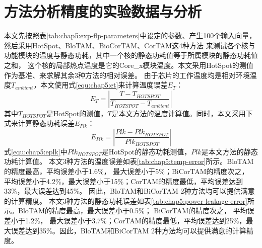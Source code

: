 \section{方法分析精度的实验数据与分析}
本文先按照表\ref{tab:chap5:exp-flp-parameters}中设定的参数、产生100个输入向量， 然后采用HotSpot、BloTAM、BioCorTAM、CorTAM这4种方法 来测试各个核与功能模块的温度与静态功耗，其中一个核的静态功耗值等于所属模块的静态功耗值之和， 这个核的局部热点温度是它的Core\_x模块温度。本文采用HotSpot的测值作为基准、来求解其余3种方法的相对误差。 由于芯片的工作温度均是相对环境温度$T_{ambient}$，本文使用式\ref{equ:chap5:et}来计算温度误差$E_T$：
\begin{equation}
\label{equ:chap5:et}
E_T = |\frac{T-T_{HOTSPOT}}{T_{HOTSPOT}-T_{ambient}}|
\end{equation}
其中$T_{HOTSPOT}$是HotSpot的测值，$T$是本文方法的温度计算值。同时，本文采用下式来计算静态功耗误差$E_{Plk}$：
\begin{equation}
\label{equ:chap5:eplk}
E_{Plk} = |\frac{Plk-Plk_{HOTSPOT}}{Plk_{HOTSPOT}}|
\end{equation}
式\ref{equ:chap5:eplk}中$Plk_{HOTSPOT}$是HotSpot的静态功耗测值，$Plk$是本文方法的静态功耗计算值。
本文3种方法的温度误差如表\ref{tab:chap5:temp-error}所示。BloTAM的精度最高，平均误差小于1.6\%， 最大误差小于5\%；BiCorTAM的精度次之， 平均误差小于4.2\%，最大误差小于15\%；CorTAM的精度最低，平均误差达到33\%，最大误差达到45\%。 因此，BloTAM和BiCorTAM 2种方法均可以提供满意的计算精度。
本文3种方法的静态功耗误差如表\ref{tab:chap5:power-leakage-error}所示。BloTAM的精度最高，最大误差小于0.5\%； BiCorTAM的精度次之， 平均误差小于1.2\%， 最大误差小于3.7\%；CorTAM的精度最低，平均误差达到25\%，最大误差达到35\%。因此，BloTAM和BiCorTAM 2种方法均可以提供满意的计算精度。
